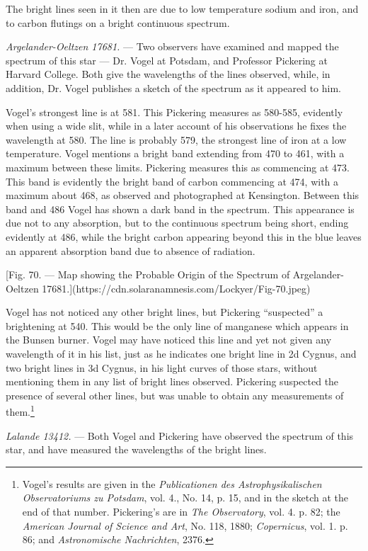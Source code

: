 \documentclass[a4paper, 12pt, oneside, polutonikogreek, english]{article}
\begin{document}
The bright lines seen in it then are due to low temperature sodium and iron, and to carbon flutings on a bright continuous spectrum.

\emph{Argelander-Oeltzen 17681.} --- Two observers have examined and mapped the spectrum of this star --- Dr. Vogel at Potsdam, and Professor Pickering at Harvard College. Both give the wavelengths of the lines observed, while, in addition, Dr. Vogel publishes a sketch of the spectrum as it appeared to him.

Vogel's strongest line is at 581. This Pickering measures as 580-585, evidently when using a wide slit, while in a later account of his observations he fixes the wavelength at 580. The line is probably 579, the strongest line of iron at a low temperature. Vogel mentions a bright band extending from 470 to 461, with a maximum between these limits. Pickering measures this as commencing at 473. This band is evidently the bright band of carbon commencing at 474, with a maximum about 468, as observed and photographed at Kensington. Between this band and 486 Vogel has shown a dark band in the spectrum. This appearance is due not to any absorption, but to the continuous spectrum being short, ending evidently at 486, while the bright carbon appearing beyond this in the blue leaves an apparent absorption band due to absence of radiation.

[Fig. 70. --- Map showing the Probable Origin of the Spectrum of Argelander-Oeltzen 17681.](https://cdn.solaranamnesis.com/Lockyer/Fig-70.jpeg)

Vogel has not noticed any other bright lines, but Pickering ``suspected'' a brightening at 540. This would be the only line of manganese which appears in the Bunsen burner. Vogel may have noticed this line and yet not given any wavelength of it in his list, just as he indicates one bright line in 2d Cygnus, and two bright lines in 3d Cygnus, in his light curves of those stars, without mentioning them in any list of bright lines observed. Pickering suspected the presence of several other lines, but was unable to obtain any measurements of them.\footnote{Vogel's results are given in the \emph{Publicationen des Astrophysikalischen Observatoriums zu Potsdam}, vol. 4., No. 14, p. 15, and in the sketch at the end of that number. Pickering's are in \emph{The Observatory}, vol. 4. p. 82; the \emph{American Journal of Science and Art}, No. 118, 1880; \emph{Copernicus}, vol. 1. p. 86; and \emph{Astronomische Nachrichten}, 2376.}

\emph{Lalande 13412.} --- Both Vogel and Pickering have observed the spectrum of this star, and have measured the wavelengths of the bright lines.
\end{document}
